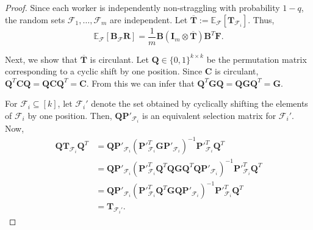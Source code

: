 \documentclass[10pt,a4paper]{amsart}
\newcommand{\bfB}{\mathbf{B}}
\newcommand{\bfF}{\mathbf{F}}
\newcommand{\bfR}{\mathbf{R}}
\newcommand{\bfT}{\mathbf{T}}
\newcommand{\cF}{\mathcal{F}}
\begin{document}
\begin{proof}
Since each worker is independently non-straggling with probability
$1-q$, the random sets $\mathcal{F}_1,\ldots,\mathcal{F}_m$ are
independent. Let
$
\overline{\mathbf{T}}
:=
\mathbb{E}_{\mathcal{F}}
[\mathbf{T}_{\mathcal{F}_i}]
.$ Thus,
\[
\mathbb{E}_{\mathcal{F}}
\left[
\bfB_{\cF}\bfR
\right]
=
\frac{1}{m} \bfB (\mathbf{I}_m\otimes\overline{\mathbf{T}}) \mathbf{B}^T \bfF.
\]

Next, we show that $\overline{\mathbf{T}}$ is circulant. Let
$\mathbf{Q}\in\{0,1\}^{k\times k}$ be the permutation matrix
corresponding to a cyclic shift by one position. Since $\mathbf{C}$
is circulant,
$
\mathbf{Q}^T\mathbf{C}\mathbf{Q}=\mathbf{Q}\mathbf{C}\mathbf{Q}^T =\mathbf{C}.
$ From this we can infer that $\mathbf{Q}^T\mathbf{G}\mathbf{Q} = \mathbf{Q}\mathbf{G}\mathbf{Q}^T
= \mathbf{G}$.


For $\mathcal{F}_i\subseteq[k]$, let $\mathcal{F}_i'$
denote the set obtained by cyclically shifting the elements of
$\mathcal{F}_i$ by one position. Then,
$\mathbf{Q}\mathbf{P}'_{\mathcal{F}_i}$ is an equivalent selection
matrix for $\mathcal{F}_i'$. 
Now,
\begin{align*}
\mathbf{Q} \bfT_{\mathcal{F}_i} \mathbf{Q}^T &= \mathbf{Q} \mathbf{P}'_{\mathcal{F}_i}
\left(
\mathbf{P}'^{T}_{\mathcal{F}_i}
\mathbf{G}
\mathbf{P}'_{\mathcal{F}_i}
\right)^{-1}
\mathbf{P}'^{T}_{\mathcal{F}_i} \mathbf{Q}^T\\
&= \mathbf{Q} \mathbf{P}'_{\mathcal{F}_i}
\left(
\mathbf{P}'^{T}_{\mathcal{F}_i}\mathbf{Q}^T\mathbf{Q}
\mathbf{G}\mathbf{Q}^T\mathbf{Q}
\mathbf{P}'_{\mathcal{F}_i}
\right)^{-1}
\mathbf{P}'^{T}_{\mathcal{F}_i} \mathbf{Q}^T\\
&= \mathbf{Q} \mathbf{P}'_{\mathcal{F}_i}
\left(
\mathbf{P}'^{T}_{\mathcal{F}_i}\mathbf{Q}^T
\mathbf{G}\mathbf{Q}
\mathbf{P}'_{\mathcal{F}_i}
\right)^{-1}
\mathbf{P}'^{T}_{\mathcal{F}_i} \mathbf{Q}^T\\
& = \bfT_{\cF_i'}.
\end{align*}



\end{proof}
\end{document}
